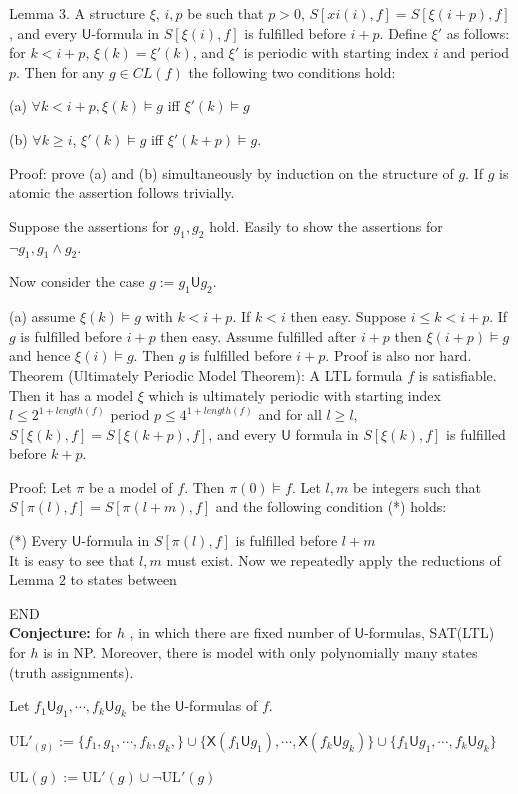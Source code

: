\documentclass[12pt]{article}
\begin{document}
\begin{CJK*}{GBK}{song}
Lemma 3. A structure $\xi$, $i, p$ be such that $p>0$, $S[xi(i),f]=S[\xi(i+p),f]$, and every $\textsf{U}$-formula in $S[\xi(i),f]$ is fulfilled before $i+p$. Define $\xi'$ as follows:
for $k<i+p$, $\xi(k)=\xi'(k)$, and $\xi'$ is periodic with starting index $i$ and period $p$. Then for any $g\in CL(f)$ the following two conditions hold:

(a) $\forall k<i+p, \xi(k)\models g$ iff $\xi'(k)\models g$

(b) $\forall k\geq i$, $\xi'(k)\models g$ iff  $\xi'(k+p)\models g$.

Proof: prove (a) and (b) simultaneously by induction on the structure of $g$. If $g$ is atomic the assertion follows trivially.

Suppose the assertions for $g_1, g_2$ hold. Easily to show the assertions for $\neg g_1, g_1\wedge g_2$.

Now consider the case $g:=g_1\textsf{U}g_2$.

(a) assume $\xi(k)\models g$ with $k<i+p$. If $k<i$ then easy. Suppose $i\leq k<i+p$. If $g$ is fulfilled before $i+p$ then easy. Assume fulfilled after $i+p$ then $\xi(i+p)\models g$ and hence $\xi(i)\models g$. Then $g$ is fulfilled before $i+p$. Proof is also nor hard.\\

Theorem (Ultimately Periodic Model Theorem): A LTL formula $f$ is satisfiable. Then it has a model $\xi$ which is ultimately periodic with starting index $l\leq 2^{1+length(f)}$ period $p\leq 4^{1+length(f)}$ and for all $l\geq l$, $S[\xi(k),f]=S[\xi(k+p),f]$, and every $\textsf{U}$ formula in $S[\xi(k),f]$ is fulfilled before $k+p$.

Proof: Let $\pi$ be a model of $f$. Then $\pi(0)\models f$. Let $l, m$ be integers such that $S[\pi(l),f]=S[\pi(l+m),f]$ and the following condition (*) holds:

(*) Every $\textsf{U}$-formula in $S[\pi(l),f]$ is fulfilled before $l+m$\\

It is easy to see that $l, m$ must  exist. Now we repeatedly apply the reductions of Lemma 2 to states between

END\\


{\bf Conjecture:} for $h$ , in which there are fixed number of $\textsf{U}$-formulas, SAT(LTL) for $h$ is in NP.
Moreover, there is model with only polynomially many states (truth assignments).

Let $f_1\textsf{U} g_1, \cdots, f_k\textsf{U}g_k$ be the $\textsf{U}$-formulas of $f$.

UL$'_(g):=\{f_1, g_1,\cdots, f_k, g_k,\}\cup \{\textsf{X}(f_1\textsf{U} g_1),\cdots, \textsf{X}(f_k\textsf{U}g_k)\}\cup \{f_1\textsf{U} g_1, \cdots, f_k\textsf{U}g_k\}$

UL$(g):=\mbox{UL}'(g)\cup \neg\mbox{UL}'(g)$



\end{CJK*}
\end{document}
